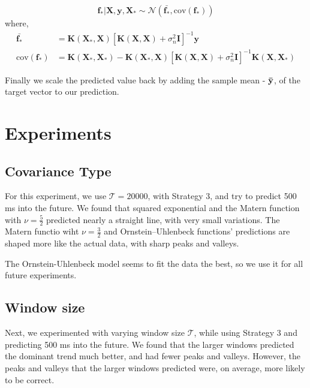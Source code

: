 \documentclass{article} %
\begin{document}
\begin{equation}
 \boldsymbol{f_*} | \boldsymbol{X}, \boldsymbol{y}, \boldsymbol{X_*} \sim \mathcal{N}\left(\bar{\boldsymbol{f_*}}, \mbox{cov}(\boldsymbol{f_*})\right)
\end{equation}
where,
\begin{align}
\bar{\boldsymbol{f_*}} &= \boldsymbol{K}\left(\boldsymbol{X_*}, \boldsymbol{X}\right) \left[ \boldsymbol{K}\left(\boldsymbol{X}, \boldsymbol{X}\right) + \sigma_n^2\boldsymbol{I}\right]^{-1} \boldsymbol{y} \\
\mbox{cov}(\boldsymbol{f_*}) &= \boldsymbol{K}\left(\boldsymbol{X_*}, \boldsymbol{X_*}\right) - \boldsymbol{K}\left(\boldsymbol{X_*}, \boldsymbol{X}\right) \left[ \boldsymbol{K}\left(\boldsymbol{X}, \boldsymbol{X}\right) + \sigma_n^2\boldsymbol{I}\right]^{-1} \boldsymbol{K}\left(\boldsymbol{X}, \boldsymbol{X_*}\right)
\end{align}

Finally we scale the predicted value back by adding the sample mean - $\bf\bar{y}$, of the target vector to our prediction.

\section{Experiments}

\subsection{Covariance Type}
For this experiment, we use $\mathcal{T} = 20000$, with Strategy 3, and try to predict 500 ms into the future.
We found that squared exponential and the Matern function with $\nu = \frac{5}{2}$ predicted nearly a straight line, with very small variations.
The Matern functio wiht $\nu = \frac{3}{2}$ and Ornstein–Uhlenbeck functions' predictions are shaped more like the actual data, with sharp peaks and valleys.

The Ornstein-Uhlenbeck model seems to fit the data the best, so we use it for all future experiments.



\subsection{Window size}
Next, we experimented with varying window size $\mathcal{T}$, while using Strategy 3 and predicting 500 ms into the future.
We found that the larger windows predicted the dominant trend much better, and had fewer peaks and valleys.
However, the peaks and valleys that the larger windows predicted were, on average, more likely to be correct.
\end{document}
